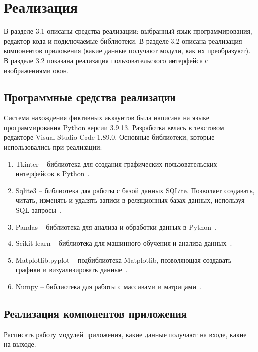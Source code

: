 \lstset{language=C, frame=L, basicstyle=\footnotesize,%
	keywordstyle=\bfseries, showstringspaces=false, xleftmargin=\parindent, numbers=none, numberstyle=\tiny, stepnumber=2, numbersep=5pt}
\newpage
\section{Реализация}
В разделе 3.1 описаны средства реализации: выбранный язык программирования, редактор кода и подключаемые библиотеки. В разделе 3.2 описана реализация компонентов приложения (какие данные получают модули, как их преобразуют). В разделе 3.2 показана реализация пользовательского интерфейса с изображениями окон.

\vspace{1.5em}
\label{sec:Realisation}
\subsection{Программные средства реализации}
Система нахождения фиктивных аккаунтов была написана на языке программирования Python версии 3.9.13. Разработка велась в текстовом редакторе Visual Studio Code 1.89.0. Основные библиотеки, которые использовались при реализации:

\vspace{-1.5em}
\begin{enumerate}[itemsep=0pt, topsep=1.5em]
    \item Tkinter -- библиотека для создания графических пользовательских интерфейсов в Python~\cite{tkinter}.
    \item Sqlite3 -- библиотека для работы с базой данных SQLite. Позволяет создавать, читать, изменять и удалять записи в реляционных базах данных, используя SQL-запросы~\cite{sqlite3}.
    \item Pandas -- библиотека для анализа и обработки данных в Python~\cite{pandas}.
    \item Scikit-learn -- библиотека для машинного обучения и анализа данных~\cite{scikit-learn}.
    \item Matplotlib.pyplot -- подбиблиотека Matplotlib, позволяющая создавать графики и визуализировать данные~\cite{maptolib}.
    \item Numpy -- библиотека для работы с массивами и матрицами~\cite{numpy}.
\end{enumerate}

\subsection{Реализация компонентов приложения}
\label{subsec:Components}
Расписать работу модулей приложения, какие данные получают на входе, какие на выходе.

